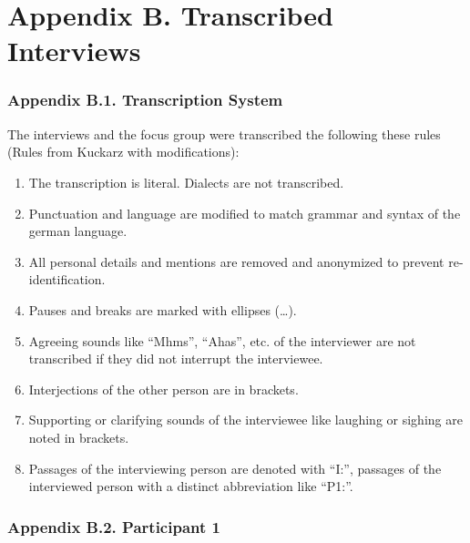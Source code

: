\documentclass{sigchi}
\begin{document}
\twocolumn
\section{Appendix B. Transcribed Interviews}

\subsubsection{Appendix B.1. Transcription System}
The interviews and the focus group were transcribed the following these rules (Rules from Kuckarz \cite{kuckartz2007} with modifications):
\begin{enumerate}
    \item The transcription is literal. Dialects are not transcribed.
    \item Punctuation and language are modified to match grammar and syntax of the german language.
    \item All personal details and mentions are removed and anonymized to prevent re-identification.
    \item Pauses and breaks are marked with ellipses (\dots).
    \item Agreeing sounds like ``Mhms'', ``Ahas'', etc. of the interviewer are not transcribed if they did not interrupt the interviewee.
    \item Interjections of the other person are in brackets.
    \item Supporting or clarifying sounds of the interviewee like laughing or sighing are noted in brackets.
    \item Passages of the interviewing person are denoted with ``I:'', passages of the interviewed person with a distinct abbreviation like ``P1:''.
\end{enumerate}

\subsubsection{Appendix B.2. Participant 1}
\end{document}
